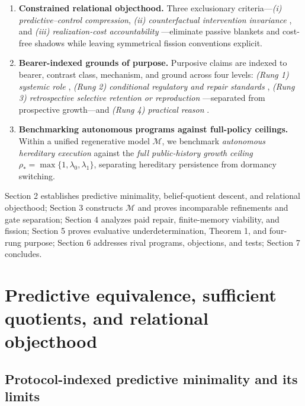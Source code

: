 \documentclass[11pt,letterpaper]{article}
\providecommand{\tightlist}{\setlength{\itemsep}{2pt}\setlength{\parskip}{0pt}}
\begin{document}
\begin{enumerate}
\def\labelenumi{\arabic{enumi}.}
\tightlist
\item
  \textbf{Constrained relational objecthood.} Three exclusionary
  criteria---\emph{(i) predictive--control compression}, \emph{(ii)
  counterfactual intervention invariance}
  \citep{hacking1983, woodward2003, craver2007}, and \emph{(iii)
  realization-cost accountability}
  \citep{jonas1966, rosen1991, montevilMossio2015}---eliminate passive
  blankets and cost-free shadows while leaving symmetrical fission
  conventions explicit.
\item
  \textbf{Bearer-indexed grounds of purpose.} Purposive claims are
  indexed to bearer, contrast class, mechanism, and ground across four
  levels: \emph{(Rung 1) systemic role} \citep{cummins1975}, \emph{(Rung
  2) conditional regulatory and repair standards}
  \citep{rosenblueth1943, mossio2009, diPaolo2005, bich2024},
  \emph{(Rung 3) retrospective selective retention or reproduction}
  \citep{wright1973, millikan1984, godfreySmith1994, garson2019}---separated
  from prospective growth---and \emph{(Rung 4) practical reason}
  \citep{korsgaard1996, scanlon1998, street2006}.
\item
  \textbf{Benchmarking autonomous programs against full-policy
  ceilings.} Within a unified regenerative model \(\mathcal{M}\), we
  benchmark \emph{autonomous hereditary execution} against the
  \emph{full public-history growth ceiling}
  \(\rho_* = \max\{1, \lambda_0, \lambda_1\}\), separating hereditary
  persistence from dormancy switching.
\end{enumerate}

Section 2 establishes predictive minimality, belief-quotient descent,
and relational objecthood; Section 3 constructs \(\mathcal{M}\) and
proves incomparable refinements and gate separation; Section 4 analyzes
paid repair, finite-memory viability, and fission; Section 5 proves
evaluative underdetermination, Theorem 1, and four-rung purpose; Section
6 addresses rival programs, objections, and tests; Section 7 concludes.

\section{Predictive equivalence, sufficient quotients, and relational
objecthood}\label{predictive-equivalence-sufficient-quotients-and-relational-objecthood}

\subsection{Protocol-indexed predictive minimality and its
limits}\label{protocol-indexed-predictive-minimality-and-its-limits}
\end{document}
